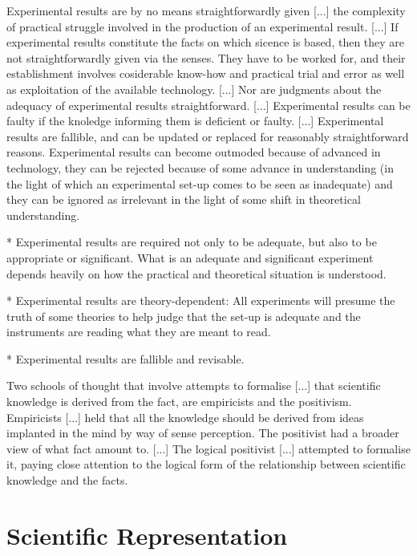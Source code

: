 {\color{red} Experimental results are by no means straightforwardly given [...] the complexity of practical struggle involved in the production of an experimental result. [...] If experimental results constitute the facts on which sicence is based, then they are not straightforwardly given via the senses. They have to be worked for, and their establishment involves cosiderable know-how and practical trial and error as well as exploitation of the available technology. [...] Nor are judgments about the adequacy of experimental results straightforward. [...] Experimental results can be faulty if the knoledge informing them is deficient or faulty. [...] Experimental results are fallible, and can be updated or replaced for reasonably straightforward reasons. Experimental results can become outmoded because of advanced in technology, they can be rejected because of some advance in understanding (in the light of which an experimental set-up comes to be seen as inadequate) and they can be ignored as irrelevant in the light of some shift in theoretical understanding. }

* Experimental results are required not only to be adequate, but also to be appropriate or significant. What is an adequate and significant experiment depends heavily on how the practical and theoretical situation is understood.

* Experimental results are theory-dependent: All experiments will presume the truth of some theories to help judge that the set-up is adequate and the instruments are reading what they are meant to read.

* Experimental results are fallible and revisable.

{\color{red} Two schools of thought that involve attempts to formalise [...] that scientific knowledge is derived from the fact, are empiricists and the positivism. Empiricists [...] held that all the knowledge should be derived from ideas implanted in the mind by way of sense perception. The positivist had a broader view of what fact amount to. [...] The logical positivist [...] attempted to formalise it, paying close attention to the logical form of the relationship between scientific knowledge and the facts. }

%
%

\section{Scientific Representation}
\label{sec:scientific_representation}


